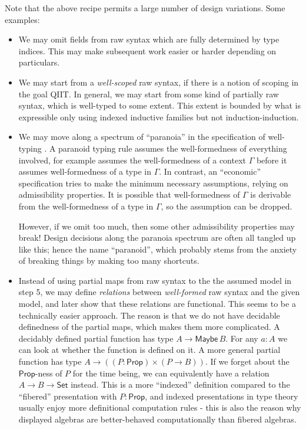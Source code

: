 \documentclass[12pt,a4paper,twoside,openany]{book}
\theoremstyle{remark}
\theoremstyle{definition}
\theoremstyle{theorem}
\newcommand{\ms}[1]{\mathsf{#1}}
\newcommand{\Set}{\mathsf{Set}}
\begin{document}
Note that the above recipe permits a large number of design variations. Some
examples:
\begin{itemize}
\item We may omit fields from raw syntax which are fully determined by type indices.
      This may make subsequent work easier or harder depending on particulars.
\item We may start from a \emph{well-scoped} raw syntax, if there is a notion of
      scoping in the goal QIIT. In general, we may start from some kind of partially
      raw syntax, which is well-typed to some extent. This extent is bounded by what
      is expressible only using indexed inductive families but not
      induction-induction.
\item We may move along a spectrum of ``paranoia'' in the specification of
      well-typing \cite[Section~9.2]{winterhalter-thesis}. A paranoid typing rule
      assumes the well-formedness of everything involved, for example assumes the
      well-formedness of a context $\Gamma$ before it assumes well-formedness of a
      type in $\Gamma$. In contrast, an ``economic'' specification tries to make the
      minimum necessary assumptions, relying on admissibility properties. It is
      possible that well-formedness of $\Gamma$ is derivable from the
      well-formedness of a type in $\Gamma$, so the assumption can be dropped.

      However, if we omit too much, then some other admissibility properties may
      break! Design decisions along the paranoia spectrum are often all tangled
      up like this; hence the name ``paranoid'', which probably stems from the
      anxiety of breaking things by making too many shortcuts.
    \item Instead of using partial maps from raw syntax to the the assumed model
      in step 5, we may define \emph{relations} between \emph{well-formed} raw
      syntax and the given model, and later show that these relations are
      functional.  This seems to be a technically easier approach. The reason is
      that we do not have decidable definedness of the partial maps, which makes
      them more complicated.  A decidably defined partial function has type $A
      \to \ms{Maybe}\,B$. For any $a : A$ we can look at whether the function is
      defined on it. A more general partial function has type $A \to ((P :
      \ms{Prop}) \times (P \to B))$.  If we forget about the $\ms{Prop}$-ness of
      $P$ for the time being, we can equivalently have a relation $A \to B \to
      \Set$ instead.  This is a more ``indexed'' definition compared to the
      ``fibered'' presentation with $P : \ms{Prop}$, and indexed presentations
      in type theory usually enjoy more definitional computation rules - this
      is also the reason why displayed algebras are better-behaved computationally
      than fibered algebras.
\end{itemize}
\end{document}
